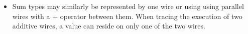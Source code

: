 \documentclass[preprint]{sigplanconf}
\begin{document}
\begin{itemize}
\item Sum types may similarly be represented by one wire or using using
  parallel wires with a {{+}} operator between them. When tracing the
  execution of two additive wires, a value can reside on only one of the two
  wires.
\begin{multicols}{2}
\begin{center}
\end{center}
\begin{center}
\end{center}
\end{multicols}
\begin{multicols}{2}
\begin{center}
\end{center}
\begin{center}
\end{center}
\end{multicols}





\end{itemize}
\end{document}
